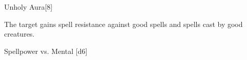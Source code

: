 
\begin{spellsection}{Unholy Aura}[8]
    \begin{spellheader}
    \end{spellheader}
    \begin{spellcontent}
        \begin{spelltargetinginfo}
        \end{spelltargetinginfo}
        \begin{spelleffects}
            \spelleffect The target gains spell resistance against good spells and spells cast by good creatures.
            \spelldur \durshort \dismissable
        \end{spelleffects}
    \end{spellcontent}
    \begin{spellsubcontent}
        \begin{spelltargetinginfo}
        \end{spelltargetinginfo}
        \begin{spelleffects}
            \begin{spellattack}{Spellpower vs. Mental}
                \spellsuccess {}[d6]
            \end{spellattack}
        \end{spelleffects}
    \end{spellsubcontent}
    \begin{spellfooter}
        \miscastexplode
    \end{spellfooter}
\end{spellsection}

